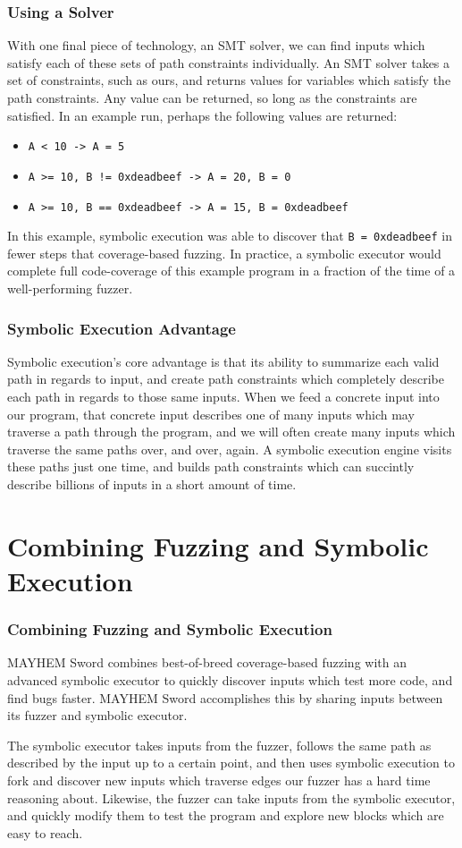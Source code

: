 \documentclass{beamer}
\begin{document}
\begin{frame}
\frametitle{Using a Solver}
With one final piece of technology, an SMT solver, we can find inputs which satisfy each of these sets of path constraints individually. An SMT solver takes a set of constraints, such as ours, and returns values for variables which satisfy the path constraints. Any value can be returned, so long as the constraints are satisfied. In an example run, perhaps the following values are returned:

\begin{itemize}
  \item \texttt{{A < 10} -> {A = 5}}
  \item \texttt{{A >= 10, B != 0xdeadbeef} -> {A = 20, B = 0}}
  \item \texttt{{A >= 10, B == 0xdeadbeef} -> {A = 15, B = 0xdeadbeef}}
\end{itemize}

In this example, symbolic execution was able to discover that \texttt{B = 0xdeadbeef} in fewer steps that coverage-based fuzzing. In practice, a symbolic executor would complete full code-coverage of this example program in a fraction of the time of a well-performing fuzzer.
\end{frame}

\begin{frame}
\frametitle{Symbolic Execution Advantage}
Symbolic execution's core advantage is that its ability to summarize each valid path in regards to input, and create path constraints which completely describe each path in regards to those same inputs. When we feed a concrete input into our program, that concrete input describes one of many inputs which may traverse a path through the program, and we will often create many inputs which traverse the same paths over, and over, again. A symbolic execution engine visits these paths just one time, and builds path constraints which can succintly describe billions of inputs in a short amount of time.
\end{frame}


\section{Combining Fuzzing and Symbolic Execution}
\begin{frame}
\frametitle{Combining Fuzzing and Symbolic Execution}
MAYHEM Sword combines best-of-breed coverage-based fuzzing with an advanced symbolic executor to quickly discover inputs which test more code, and find bugs faster. MAYHEM Sword accomplishes this by sharing inputs between its fuzzer and symbolic executor.

The symbolic executor takes inputs from the fuzzer, follows the same path as described by the input up to a certain point, and then uses symbolic execution to fork and discover new inputs which traverse edges our fuzzer has a hard time reasoning about. Likewise, the fuzzer can take inputs from the symbolic executor, and quickly modify them to test the program and explore new blocks which are easy to reach.
\end{frame}
\end{document}
